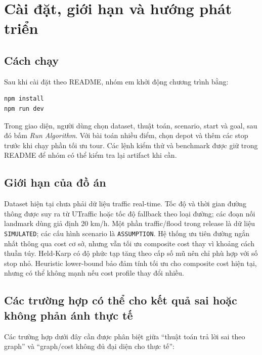 \section{Cài đặt, giới hạn và hướng phát triển}
\subsection{Cách chạy}
Sau khi cài đặt theo README, nhóm em khởi động chương trình bằng:
\begin{verbatim}
npm install
npm run dev
\end{verbatim}
Trong giao diện, người dùng chọn dataset, thuật toán, scenario, start và goal, sau đó bấm \textit{Run Algorithm}. Với bài toán nhiều điểm, chọn depot và thêm các stop trước khi chạy phần tối ưu tour. Các lệnh kiểm thử và benchmark được giữ trong README để nhóm có thể kiểm tra lại artifact khi cần.

\subsection{Giới hạn của đồ án}
Dataset hiện tại chưa phải dữ liệu traffic real-time. Tốc độ và thời gian đường thông được suy ra từ UTraffic hoặc tốc độ fallback theo loại đường; các đoạn nối landmark dùng giả định 20 km/h. Một phần traffic/flood trong release là dữ liệu \texttt{SIMULATED}; các cấu hình scenario là \texttt{ASSUMPTION}. Hệ thống ưu tiên đường ngắn nhất thông qua cost cơ sở, nhưng vẫn tối ưu composite cost thay vì khoảng cách thuần túy. Held-Karp có độ phức tạp tăng theo cấp số mũ nên chỉ phù hợp với số stop nhỏ. Heuristic lower-bound bảo đảm tính tối ưu cho composite cost hiện tại, nhưng có thể không mạnh nếu cost profile thay đổi nhiều.

\subsection{Các trường hợp có thể cho kết quả sai hoặc không phản ánh thực tế}
Các trường hợp dưới đây cần được phân biệt giữa ``thuật toán trả lời sai theo graph'' và ``graph/cost không đủ đại diện cho thực tế'':

